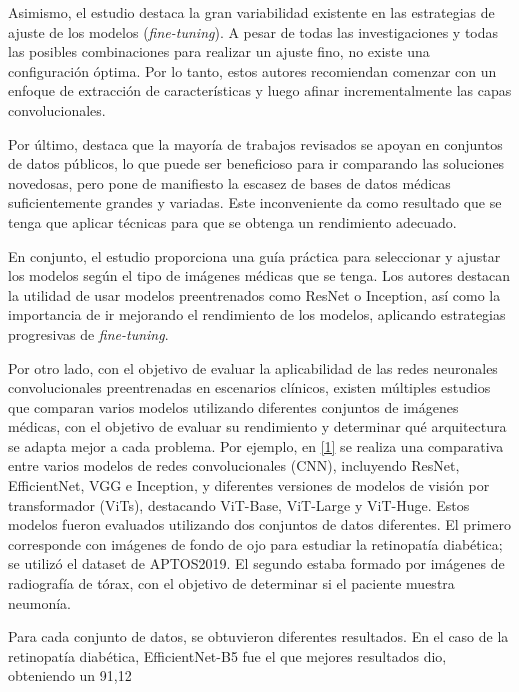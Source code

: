\documentclass[11pt, a4paper]{article}
\numberwithin{equation}{section}
\begin{document}
Asimismo, el estudio destaca la gran variabilidad existente en las estrategias de ajuste de los modelos (\textit{fine-tuning}). A pesar de todas las investigaciones y todas las posibles combinaciones para realizar un ajuste fino, no existe una configuración óptima. Por lo tanto, estos autores recomiendan comenzar con un enfoque de extracción de características y luego afinar incrementalmente las capas convolucionales.

Por último, destaca que la mayoría de trabajos revisados se apoyan en conjuntos de datos públicos, lo que puede ser beneficioso para ir comparando las soluciones novedosas, pero pone de manifiesto la escasez de bases de datos médicas suficientemente grandes y variadas. Este inconveniente da como resultado que se tenga que aplicar técnicas para que se obtenga un rendimiento adecuado.

En conjunto, el estudio proporciona una guía práctica para seleccionar y ajustar los modelos según el tipo de imágenes médicas que se tenga. Los autores destacan la utilidad de usar modelos preentrenados como ResNet o Inception, así como la importancia de ir mejorando el rendimiento de los modelos, aplicando estrategias progresivas de \textit{fine-tuning}.

Por otro lado, con el objetivo de evaluar la aplicabilidad de las redes neuronales convolucionales preentrenadas en escenarios clínicos, existen múltiples estudios que comparan varios modelos utilizando diferentes conjuntos de imágenes médicas, con el objetivo de evaluar su rendimiento y determinar qué arquitectura se adapta mejor a cada problema. Por ejemplo, en \hyperlink{ref:1}{[1]} se realiza una comparativa entre varios modelos de redes convolucionales (CNN), incluyendo ResNet, EfficientNet, VGG e Inception, y diferentes versiones de modelos de visión por transformador (ViTs), destacando ViT-Base, ViT-Large y ViT-Huge. Estos modelos fueron evaluados utilizando dos conjuntos de datos diferentes. El primero corresponde con imágenes de fondo de ojo para estudiar la retinopatía diabética; se utilizó el dataset de APTOS2019. El segundo estaba formado por imágenes de radiografía de tórax, con el objetivo de determinar si el paciente muestra neumonía.

Para cada conjunto de datos, se obtuvieron diferentes resultados. En el caso de la retinopatía diabética, EfficientNet-B5 fue el que mejores resultados dio, obteniendo un 91,12%
\end{document}

